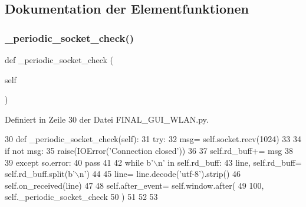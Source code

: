 \subsection{Dokumentation der Elementfunktionen}
\mbox{\label{class_f_i_n_a_l___g_u_i___w_l_a_n_1_1_arduino_ae9e6aab11376e92d980b2c9f2c7d3883}} 
\subsubsection{\texorpdfstring{\+\_\+periodic\+\_\+socket\+\_\+check()}{\_periodic\_socket\_check()}}
{\footnotesize\ttfamily def \+\_\+periodic\+\_\+socket\+\_\+check (\begin{DoxyParamCaption}\item[{}]{self }\end{DoxyParamCaption})\hspace{0.3cm}{\ttfamily [private]}}



Definiert in Zeile 30 der Datei F\+I\+N\+A\+L\+\_\+\+G\+U\+I\+\_\+\+W\+L\+A\+N.\+py.


\begin{DoxyCode}
30     \textcolor{keyword}{def }\_periodic\_socket\_check(self):
31         \textcolor{keywordflow}{try}:
32             msg= self.socket.recv(1024)
33 
34             \textcolor{keywordflow}{if} \textcolor{keywordflow}{not} msg:
35                 raise(IOError(\textcolor{stringliteral}{'Connection closed'}))
36 
37             self.rd\_buff+= msg
38 
39         \textcolor{keywordflow}{except} so.error:
40             \textcolor{keywordflow}{pass}
41 
42         \textcolor{keywordflow}{while} b\textcolor{stringliteral}{'\(\backslash\)n'} \textcolor{keywordflow}{in} self.rd\_buff:
43             line, self.rd\_buff= self.rd\_buff.split(b\textcolor{stringliteral}{'\(\backslash\)n'})
44 
45             line= line.decode(\textcolor{stringliteral}{'utf-8'}).strip()
46             self.on\_received(line)
47 
48         self.after\_event= self.window.after(
49             100, self.\_periodic\_socket\_check
50         )
51 
52 
53 
\end{DoxyCode}
\mbox{\label{class_f_i_n_a_l___g_u_i___w_l_a_n_1_1_arduino_a8639372c33e15084a7f7c4d9d87b7bfe}} 
